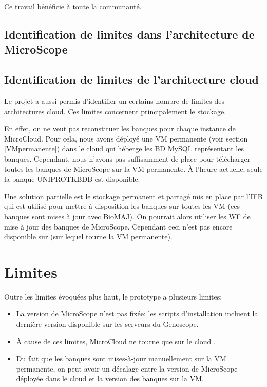 Ce travail bénéficie à toute la communauté.

\subsection{Identification de limites dans l'architecture de MicroScope}


\subsection{Identification de limites de l'architecture cloud}

Le projet a aussi permis d'identifier un certains nombre de limites des architectures cloud.
Ces limites concernent principalement le stockage.

En effet, on ne veut pas reconstituer les banques pour chaque instance de MicroCloud.
Pour cela, nous  avons déployé une VM permanente (voir section \ref{VMpermanente}) dans le cloud 
qui héberge les BD MySQL représentant les banques.
Cependant, nous n'avons pas suffisamment de place pour télécharger toutes les banques de MicroScope sur la VM permanente.
À l'heure actuelle, seule la banque UNIPROTKBDB est disponible.

Une solution partielle est le stockage permanent et partagé mis en place par l'IFB
qui est utilisé pour mettre à disposition les banques sur toutes les VM (ces banques sont mises à jour avec BioMAJ).
On pourrait alors utiliser les WF de mise à jour des banques de MicroScope.
Cependant ceci n'est pas encore disponible sur  (sur lequel tourne la VM permanente).

\section{Limites}

Outre les limites évoquées plus haut, le prototype a plusieurs limites:
\begin{itemize}
	\item La version de MicroScope n'est pas fixée: les scripts d'installation incluent la dernière version disponible sur les serveurs du Genoscope.
	\item À cause de ces limites, MicroCloud ne tourne que sur le cloud .
	\item Du fait que les banques sont mises-à-jour manuellement sur la VM permanente, on peut avoir un décalage entre la version de MicroScope déployée dans le cloud
	et la version des banques sur la VM.
\end{itemize}

